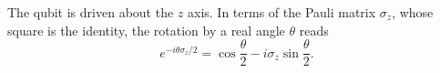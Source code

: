 \documentclass{article}
\begin{document}
The qubit is driven about the $z$ axis. In terms of the Pauli matrix $\sigma_z$, whose square is the
identity, the rotation by a real angle $\theta$ reads
\begin{equation}
e^{-i\theta\sigma_z/2} = \cos\frac{\theta}{2} - i\sigma_z\sin\frac{\theta}{2} .
\label{eq:rot}
\end{equation}
\end{document}
